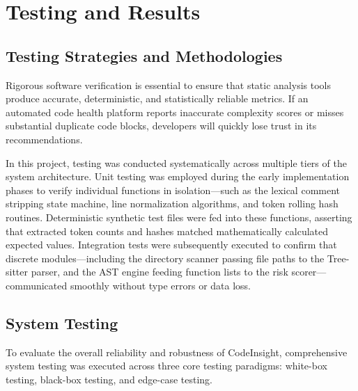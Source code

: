 \chapter{Testing and Results}

\section{Testing Strategies and Methodologies}
Rigorous software verification is essential to ensure that static analysis tools produce accurate, deterministic, and statistically reliable metrics. If an automated code health platform reports inaccurate complexity scores or misses substantial duplicate code blocks, developers will quickly lose trust in its recommendations. 

In this project, testing was conducted systematically across multiple tiers of the system architecture. Unit testing was employed during the early implementation phases to verify individual functions in isolation—such as the lexical comment stripping state machine, line normalization algorithms, and token rolling hash routines. Deterministic synthetic test files were fed into these functions, asserting that extracted token counts and hashes matched mathematically calculated expected values. Integration tests were subsequently executed to confirm that discrete modules—including the directory scanner passing file paths to the Tree-sitter parser, and the AST engine feeding function lists to the risk scorer—communicated smoothly without type errors or data loss.

\section{System Testing}
To evaluate the overall reliability and robustness of CodeInsight, comprehensive system testing was executed across three core testing paradigms: white-box testing, black-box testing, and edge-case testing.

